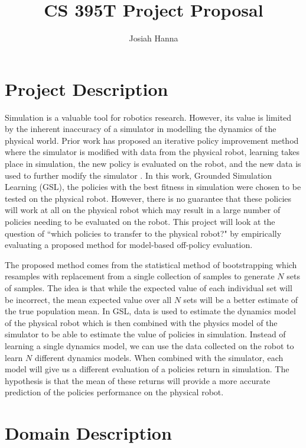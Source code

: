 \documentclass[12 pt]{article}
\author{Josiah Hanna}
\title{CS 395T Project Proposal}
\begin{document}
\maketitle

\section{Project Description}

Simulation is a valuable tool for robotics research. However, its value is limited by the inherent inaccuracy of a simulator in modelling the dynamics of the physical world. Prior work has proposed an iterative policy improvement method where the simulator is modified with data from the physical robot, learning takes place in simulation, the new policy is evaluated on the robot, and the new data is used to further modify the simulator \cite{farchy2013humanoid}. In this work, Grounded Simulation Learning (GSL), the policies with the best fitness in simulation were chosen to be tested on the physical robot. However, there is no guarantee that these policies will work at all on the physical robot which may result in a large number of policies needing to be evaluated on the robot. This project will look at the question of ``which policies to transfer to the physical robot?" by empirically evaluating a proposed method for model-based off-policy evaluation.

The proposed method comes from the statistical method of bootstrapping which resamples with replacement from a single collection of samples to generate $N$ sets of samples. The idea is that while the expected value of each individual set will be incorrect, the mean expected value over all $N$ sets will be a better estimate of the true population mean. In GSL, data is used to estimate the dynamics model of the physical robot which is then combined with the physics model of the simulator to be able to estimate the value of policies in simulation. Instead of learning a single dynamics model, we can use the data collected on the robot to learn $N$ different dynamics models. When combined with the simulator, each model will give us a different evaluation of a policies return in simulation. The hypothesis is that the mean of these returns will provide a more accurate prediction of the policies performance on the physical robot.


\section{Domain Description}
\end{document}
